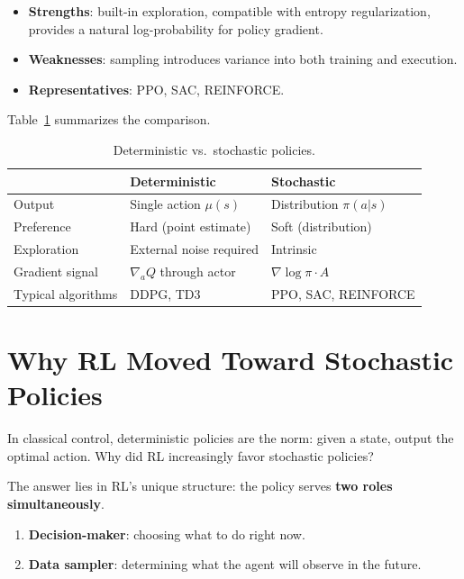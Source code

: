 \begin{itemize}[nosep]
  \item \textbf{Strengths}: built-in exploration, compatible with entropy
    regularization, provides a natural log-probability for policy gradient.
  \item \textbf{Weaknesses}: sampling introduces variance into both training
    and execution.
  \item \textbf{Representatives}: PPO, SAC, REINFORCE.
\end{itemize}

Table~\ref{tab:det-stoch} summarizes the comparison.

\begin{table}[ht]
\centering
\caption{Deterministic vs.\ stochastic policies.}
\label{tab:det-stoch}
\begin{tabular}{@{}lll@{}}
\toprule
& \textbf{Deterministic} & \textbf{Stochastic} \\
\midrule
Output       & Single action $\mu(s)$ & Distribution $\pi(a|s)$ \\
Preference   & Hard (point estimate)  & Soft (distribution) \\
Exploration  & External noise required & Intrinsic \\
Gradient signal & $\nabla_a Q$ through actor & $\nabla\log\pi \cdot A$ \\
Typical algorithms & DDPG, TD3 & PPO, SAC, REINFORCE \\
\bottomrule
\end{tabular}
\end{table}


\section{Why RL Moved Toward Stochastic Policies}
\label{sec:why-stochastic}

In classical control, deterministic policies are the norm: given a state, output
the optimal action.  Why did RL increasingly favor stochastic policies?

The answer lies in RL's unique structure: the policy serves \textbf{two roles
simultaneously}.

\begin{enumerate}
  \item \textbf{Decision-maker}: choosing what to do right now.
  \item \textbf{Data sampler}: determining what the agent will observe in the
    future.
\end{enumerate}

